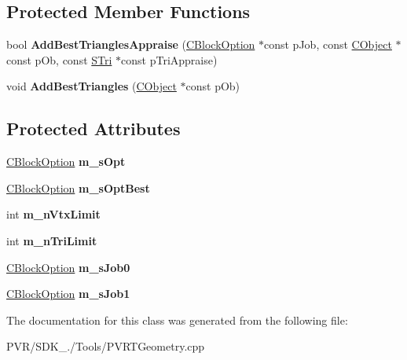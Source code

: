 \subsection*{Protected Member Functions}
\begin{DoxyCompactItemize}
\item 
\hypertarget{class_c_block_adb04efeeeee3c8327b99c6af9c603618}{bool {\bfseries Add\+Best\+Triangles\+Appraise} (\hyperlink{struct_c_block_option}{C\+Block\+Option} $\ast$const p\+Job, const \hyperlink{class_c_object}{C\+Object} $\ast$const p\+Ob, const \hyperlink{struct_s_tri}{S\+Tri} $\ast$const p\+Tri\+Appraise)}\label{class_c_block_adb04efeeeee3c8327b99c6af9c603618}

\item 
\hypertarget{class_c_block_aff641fdc967f42372c120452c39baaba}{void {\bfseries Add\+Best\+Triangles} (\hyperlink{class_c_object}{C\+Object} $\ast$const p\+Ob)}\label{class_c_block_aff641fdc967f42372c120452c39baaba}

\end{DoxyCompactItemize}
\subsection*{Protected Attributes}
\begin{DoxyCompactItemize}
\item 
\hypertarget{class_c_block_a1275f2568e4151c35d763d0a04144665}{\hyperlink{struct_c_block_option}{C\+Block\+Option} {\bfseries m\+\_\+s\+Opt}}\label{class_c_block_a1275f2568e4151c35d763d0a04144665}

\item 
\hypertarget{class_c_block_a54703b712605bea89d37685eef2bbbc8}{\hyperlink{struct_c_block_option}{C\+Block\+Option} {\bfseries m\+\_\+s\+Opt\+Best}}\label{class_c_block_a54703b712605bea89d37685eef2bbbc8}

\item 
\hypertarget{class_c_block_a46f249a6cc2ce6efa845a56a8439dfc3}{int {\bfseries m\+\_\+n\+Vtx\+Limit}}\label{class_c_block_a46f249a6cc2ce6efa845a56a8439dfc3}

\item 
\hypertarget{class_c_block_a3fe593e3c242df5ef45dfebe5390dd83}{int {\bfseries m\+\_\+n\+Tri\+Limit}}\label{class_c_block_a3fe593e3c242df5ef45dfebe5390dd83}

\item 
\hypertarget{class_c_block_aa13d85cb3b76c8627175d282291b5b5e}{\hyperlink{struct_c_block_option}{C\+Block\+Option} {\bfseries m\+\_\+s\+Job0}}\label{class_c_block_aa13d85cb3b76c8627175d282291b5b5e}

\item 
\hypertarget{class_c_block_a77d97ada155a044b41980b6aeee0a9c2}{\hyperlink{struct_c_block_option}{C\+Block\+Option} {\bfseries m\+\_\+s\+Job1}}\label{class_c_block_a77d97ada155a044b41980b6aeee0a9c2}

\end{DoxyCompactItemize}


The documentation for this class was generated from the following file\+:\begin{DoxyCompactItemize}
\item 
P\+V\+R/\+S\+D\+K\+\_./\+Tools/P\+V\+R\+T\+Geometry.\+cpp\end{DoxyCompactItemize}
